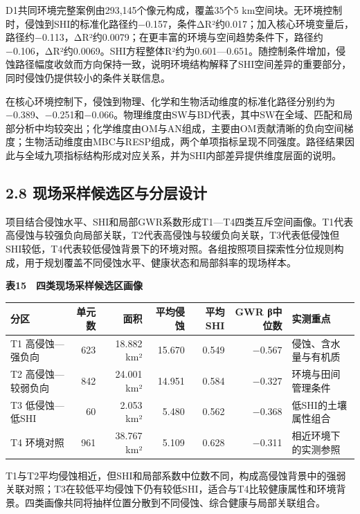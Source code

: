 \documentclass[
  11pt,
  a4paper,
]{ctexart}
\begin{document}
D1共同环境完整案例由293,145个像元构成，覆盖35个5
km空间块。无环境控制时，侵蚀到SHI的标准化路径约−0.157，条件ΔR²约0.017；加入核心环境变量后，路径约−0.113，ΔR²约0.0079；在更丰富的环境与空间趋势条件下，路径约−0.106，ΔR²约0.0069。SHI方程整体R²约为0.601---0.651。随控制条件增加，侵蚀路径幅度收敛而方向保持一致，说明环境结构解释了SHI空间差异的重要部分，同时侵蚀仍提供较小的条件关联信息。

在核心环境控制下，侵蚀到物理、化学和生物活动维度的标准化路径分别约为−0.389、−0.251和−0.066。物理维度由SW与BD代表，其中SW在全域、匹配和局部分析中均较突出；化学维度由OM与AN组成，主要由OM贡献清晰的负向空间梯度；生物活动维度由MBC与RESP组成，两个单项指标呈现不同强度。路径结果因此与全域九项指标结构形成对应关系，并为SHI内部差异提供维度层面的说明。

\hypertarget{ux73b0ux573aux91c7ux6837ux5019ux9009ux533aux4e0eux5206ux5c42ux8bbeux8ba1}{%
\subsection{2.8
现场采样候选区与分层设计}\label{ux73b0ux573aux91c7ux6837ux5019ux9009ux533aux4e0eux5206ux5c42ux8bbeux8ba1}}

项目结合侵蚀水平、SHI和局部GWR系数形成T1---T4四类互斥空间画像。T1代表高侵蚀与较强负向局部关联，T2代表高侵蚀与较缓负向关联，T3代表低侵蚀但SHI较低，T4代表较低侵蚀背景下的环境对照。各组按照项目探索性分位规则构成，用于规划覆盖不同侵蚀水平、健康状态和局部斜率的现场样本。

\textbf{表15　四类现场采样候选区画像}

\begin{longtable}[]{@{}lrrrrrl@{}}
\toprule
分区 & 单元数 & 面积 & 平均侵蚀 & 平均SHI & GWR β中位数 & 实测重点 \\
\midrule
\endhead
T1 高侵蚀---强负向 & 623 & 18.882 km² & 15.670 & 0.549 & −0.567 &
侵蚀、含水量与有机质 \\
T2 高侵蚀---较弱负向 & 842 & 24.001 km² & 14.951 & 0.584 & −0.327 &
环境与田间管理条件 \\
T3 低侵蚀---低SHI & 60 & 2.053 km² & 5.480 & 0.562 & −0.368 &
低SHI的土壤属性组合 \\
T4 环境对照 & 961 & 38.767 km² & 5.109 & 0.628 & −0.311 &
相近环境下的实测参照 \\
\bottomrule
\end{longtable}

T1与T2平均侵蚀相近，但SHI和局部系数中位数不同，构成高侵蚀背景中的强弱关联对照；T3在较低平均侵蚀下仍有较低SHI，适合与T4比较健康属性和环境背景。四类画像共同将抽样位置分散到不同侵蚀、综合健康与局部关联组合。
\end{document}

